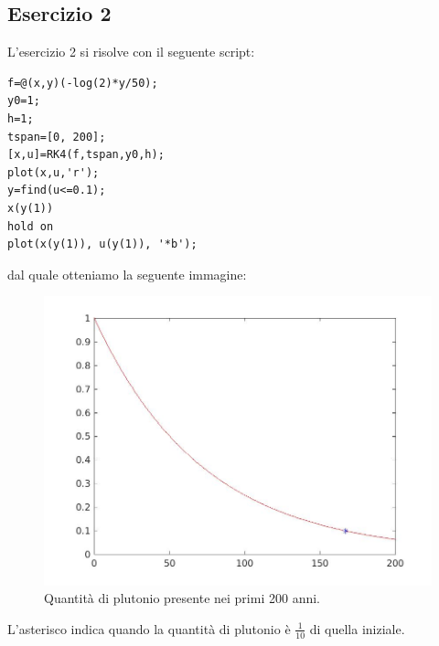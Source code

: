 \documentclass[11pt,a4paper,twoside,openright,titlepage,
headinclude,footinclude,BCOR5mm,
numbers=noenddot,cleardoublepage=empty,
tablecaptionabove]{scrbook}
\begin{document}
\subsection{Esercizio 2}
L'esercizio 2 si risolve con il seguente script:
\begin{lstlisting}[frame=trBL]
f=@(x,y)(-log(2)*y/50);
y0=1;
h=1;
tspan=[0, 200];
[x,u]=RK4(f,tspan,y0,h);
plot(x,u,'r');
y=find(u<=0.1);
x(y(1))
hold on
plot(x(y(1)), u(y(1)), '*b'); 
\end{lstlisting}
dal quale otteniamo la seguente immagine:
\begin{center}
\begin{figure}[h!]
\includegraphics[width=\textwidth]{figs/ese2_s.jpg}
\caption{Quantità di plutonio presente nei primi 200 anni.}
\end{figure}
\end{center}
L'asterisco indica quando la quantità di plutonio è $\frac{1}{10}$ di quella iniziale.
\end{document}
